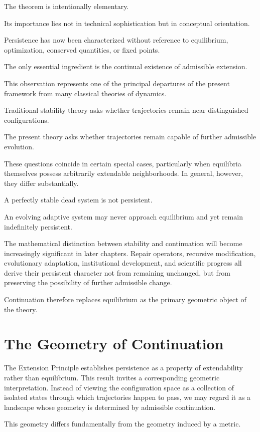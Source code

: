 \documentclass[11pt]{book}
\numberwithin{equation}{chapter}
\theoremstyle{definition}
\theoremstyle{plain}
\begin{document}
The theorem is intentionally elementary.

Its importance lies not in technical sophistication but in conceptual orientation.

Persistence has now been characterized without reference to equilibrium, optimization, conserved quantities, or fixed points.

The only essential ingredient is the continual existence of admissible extension.

This observation represents one of the principal departures of the present framework from many classical theories of dynamics.

Traditional stability theory asks whether trajectories remain near distinguished configurations.

The present theory asks whether trajectories remain capable of further admissible evolution.

These questions coincide in certain special cases, particularly when equilibria themselves possess arbitrarily extendable neighborhoods. In general, however, they differ substantially.

A perfectly stable dead system is not persistent.

An evolving adaptive system may never approach equilibrium and yet remain indefinitely persistent.

The mathematical distinction between stability and continuation will become increasingly significant in later chapters. Repair operators, recursive modification, evolutionary adaptation, institutional development, and scientific progress all derive their persistent character not from remaining unchanged, but from preserving the possibility of further admissible change.

Continuation therefore replaces equilibrium as the primary geometric object of the theory.

\section{The Geometry of Continuation}

The Extension Principle establishes persistence as a property of extendability rather than equilibrium. This result invites a corresponding geometric interpretation. Instead of viewing the configuration space as a collection of isolated states through which trajectories happen to pass, we may regard it as a landscape whose geometry is determined by admissible continuation.

This geometry differs fundamentally from the geometry induced by a metric.
\end{document}
